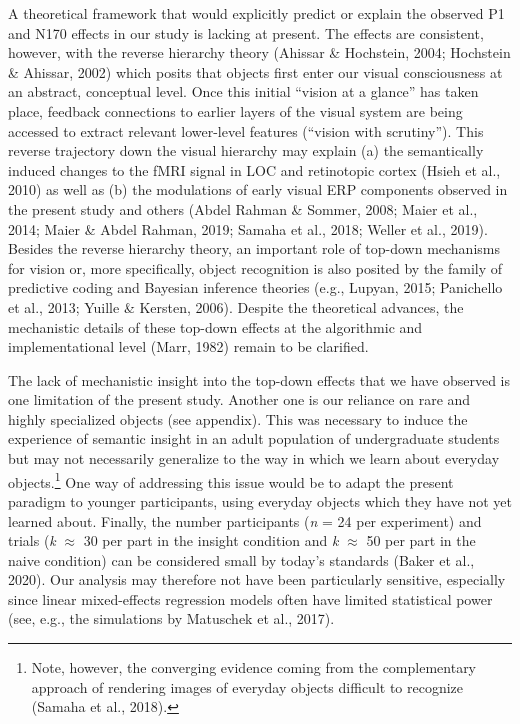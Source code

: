 \documentclass[
  english,
  doc,12pt,twoside,floatsintext]{apa7}
\begin{document}
A theoretical framework that would explicitly predict or explain the observed P1 and N170 effects in our study is lacking at present. The effects are consistent, however, with the reverse hierarchy theory (Ahissar \& Hochstein, 2004; Hochstein \& Ahissar, 2002) which posits that objects first enter our visual consciousness at an abstract, conceptual level. Once this initial ``vision at a glance'' has taken place, feedback connections to earlier layers of the visual system are being accessed to extract relevant lower-level features (``vision with scrutiny''). This reverse trajectory down the visual hierarchy may explain (a) the semantically induced changes to the fMRI signal in LOC and retinotopic cortex (Hsieh et al., 2010) as well as (b) the modulations of early visual ERP components observed in the present study and others (Abdel Rahman \& Sommer, 2008; Maier et al., 2014; Maier \& Abdel Rahman, 2019; Samaha et al., 2018; Weller et al., 2019). Besides the reverse hierarchy theory, an important role of top-down mechanisms for vision or, more specifically, object recognition is also posited by the family of predictive coding and Bayesian inference theories (e.g., Lupyan, 2015; Panichello et al., 2013; Yuille \& Kersten, 2006). Despite the theoretical advances, the mechanistic details of these top-down effects at the algorithmic and implementational level (Marr, 1982) remain to be clarified.

The lack of mechanistic insight into the top-down effects that we have observed is one limitation of the present study. Another one is our reliance on rare and highly specialized objects (see appendix). This was necessary to induce the experience of semantic insight in an adult population of undergraduate students but may not necessarily generalize to the way in which we learn about everyday objects.\footnote{Note, however, the converging evidence coming from the complementary approach of rendering images of everyday objects difficult to recognize (Samaha et al., 2018).} One way of addressing this issue would be to adapt the present paradigm to younger participants, using everyday objects which they have not yet learned about. Finally, the number participants (\emph{n} = 24 per experiment) and trials (\emph{k} \(\approx\) 30 per part in the insight condition and \emph{k} \(\approx\) 50 per part in the naive condition) can be considered small by today's standards (Baker et al., 2020). Our analysis may therefore not have been particularly sensitive, especially since linear mixed-effects regression models often have limited statistical power (see, e.g., the simulations by Matuschek et al., 2017).
\end{document}
